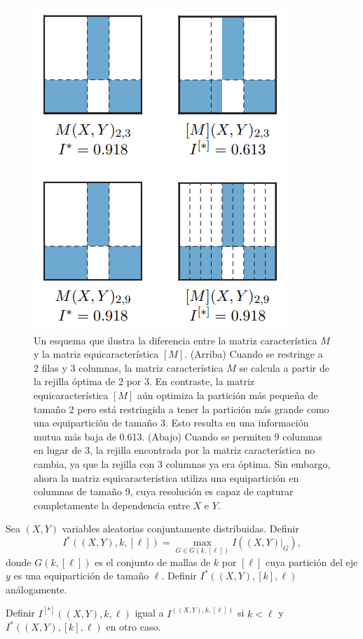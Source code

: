         \begin{figure} 
            \centering
            \includegraphics[scale=0.6]{figuras/figure_1_reshef_2016.png}
            \caption{Un esquema que ilustra la diferencia entre la matriz caracter\'istica $M$ y la matriz equicaracter\'istica $[M]$. (Arriba) Cuando se restringe a 2 filas y 3 columnas, la matriz caracter\'istica $M$ se calcula a partir de la rejilla \'optima de 2 por 3. En contraste, la matriz equicaracter\'istica $[M]$ a\'un optimiza la partici\'on m\'as peque\~na de tama\~no 2 pero est\'a restringida a tener la partici\'on m\'as grande como una equipartici\'on de tama\~no 3. Esto resulta en una informaci\'on mutua m\'as baja de 0.613. (Abajo) Cuando se permiten 9 columnas en lugar de 3, la rejilla encontrada por la matriz caracter\'istica no cambia, ya que la rejilla con 3 columnas ya era \'optima. Sin embargo, ahora la matriz equicaracter\'istica utiliza una equipartici\'on en columnas de tama\~no 9, cuya resoluci\'on es capaz de capturar completamente la dependencia entre $X$ e $Y$.}
            \label{fig:matriz_equicaracteristica}
        \end{figure}
        
    
        \begin{defn}
            Sea $(X, Y)$ variables aleatorias conjuntamente distribuidas. Definir
            $$
            I^*((X, Y), k,[\ell])=\max _{G \in G(k,[\ell])} I\left(\left.(X, Y)\right|_G\right),
            $$
            donde $G(k,[\ell])$ es el conjunto de mallas de $k$ por $[\ell]$ cuya partici\'on del eje $y$ es una equipartici\'on de tama\~no $\ell$. Definir $I^*((X, Y),[k], \ell)$ an\'alogamente.
    
            Definir $I^{[*]}((X, Y), k, \ell)$ igual a $I^((X, Y), k,[\ell])$ si $k<\ell$ y $I^*((X, Y),[k], \ell)$ en otro caso.
        \end{defn}
    

